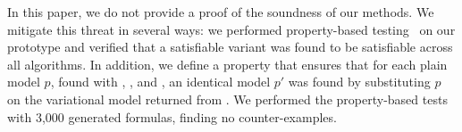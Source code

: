 In this paper, we do not provide a proof of the soundness of our methods. We
mitigate this threat in several ways: we performed property-based
testing~\citep{quickcheck} on our prototype and verified that a satisfiable
variant was found to be satisfiable across all algorithms. In addition, we
define a property that ensures that for each plain model $p$, found with
\pTov{}, \vTop{}, and \pTop{}, an identical model $p'$ was found by substituting
$p$ on the variational model returned from \vsat{}. We performed the
property-based tests with 3,000 generated \vpl{} formulas, finding no
counter-examples.



